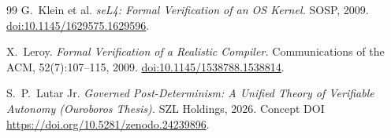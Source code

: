 \documentclass[10pt,letterpaper]{article}
\theoremstyle{definition}
\begin{document}
\begin{thebibliography}{99}
G.\ Klein et al.
\emph{seL4: Formal Verification of an OS Kernel.}
SOSP, 2009.
\href{https://doi.org/10.1145/1629575.1629596}{doi:10.1145/1629575.1629596}.

X.\ Leroy.
\emph{Formal Verification of a Realistic Compiler.}
Communications of the ACM, 52(7):107--115, 2009.
\href{https://doi.org/10.1145/1538788.1538814}{doi:10.1145/1538788.1538814}.

S.\ P.\ Lutar Jr.
\emph{Governed Post-Determinism: A Unified Theory of Verifiable Autonomy
(Ouroboros Thesis).}
SZL Holdings, 2026. Concept DOI
\url{https://doi.org/10.5281/zenodo.24239896}.
\end{thebibliography}
\end{document}
